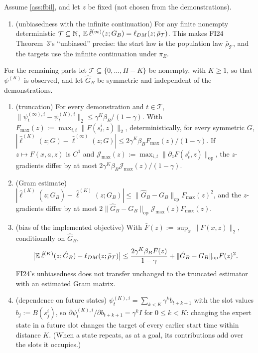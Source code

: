 \begin{proposition}\label{prop:fbil-est}
Assume \cref{ass:fbil}, and let $z$ be fixed (not chosen from the demonstrations).
\begin{enumerate}[nosep,label=(\alph*)]
\item (unbiasedness with the infinite continuation) For any finite nonempty deterministic $\mathcal T\subseteq\mathbb{N}$, $\mathbb{E}\,\hat\ell^{(\infty)}(z;G_B)=\ell_{DM}(z;\bar\rho_{\mathcal T})$.
  This makes FI24 Theorem~3's ``unbiased'' precise: the start law is the population law $\bar\rho_{\mathcal T}$, and the targets use the infinite continuation under $\pi_E$.
\end{enumerate}
For the remaining parts let $\mathcal T\subseteq\{0,\dots,H-K\}$ be nonempty, with $K\ge1$, so that $\psi^{(K)}$ is observed, and let $\hat G_B$ be symmetric and independent of the demonstrations.
\begin{enumerate}[resume*]
\item (truncation) For every demonstration and $t\in\mathcal T$, $\|\psi^{(\infty),i}_t-\psi^{(K),i}_t\|_2\le\gamma^K\beta_B/(1-\gamma)$.
  With $F_{\max}(z):=\max_{i,t}\|F(s^i_t,z)\|_2$, deterministically, for every symmetric $G$,
  $|\hat\ell^{(K)}(z;G)-\hat\ell^{(\infty)}(z;G)|\le2\gamma^K\beta_BF_{\max}(z)/(1-\gamma)$.
  If $z\mapsto F(x,a,z)$ is $C^1$ and $\mathcal J_{\max}(z):=\max_{i,t}\|\partial_zF(s^i_t,z)\|_{\mathrm{op}}$, the $z$-gradients differ by at most $2\gamma^K\beta_B\mathcal J_{\max}(z)/(1-\gamma)$.
\item (Gram estimate) $|\hat\ell^{(K)}(z;\hat G_B)-\hat\ell^{(K)}(z;G_B)|\le\|\hat G_B-G_B\|_{\mathrm{op}}F_{\max}(z)^2$, and the $z$-gradients differ by at most $2\|\hat G_B-G_B\|_{\mathrm{op}}\mathcal J_{\max}(z)F_{\max}(z)$.
\item (bias of the implemented objective) With $\bar F(z):=\sup_x\|F(x,z)\|_2$, conditionally on $\hat G_B$,
  \[
  \big|\mathbb{E}\,\hat\ell^{(K)}(z;\hat G_B)-\ell_{DM}(z;\bar\rho_{\mathcal T})\big|\le\frac{2\gamma^K\beta_B\bar F(z)}{1-\gamma}+\|\hat G_B-G_B\|_{\mathrm{op}}\bar F(z)^2 .
  \]
  FI24's unbiasedness does not transfer unchanged to the truncated estimator with an estimated Gram matrix.
\item (dependence on future states) $\psi^{(K),i}_t=\sum_{k<K}\gamma^kb_{t+k+1}$ with the slot values $b_j:=B(s^i_j)$, so $\partial\psi^{(K),i}_t/\partial b_{t+k+1}=\gamma^kI$ for $0\le k<K$: changing the expert state in a future slot changes the target of every earlier start time within distance $K$. (When a state repeats, as at a goal, its contributions add over the slots it occupies.)
\end{enumerate}
\end{proposition}
